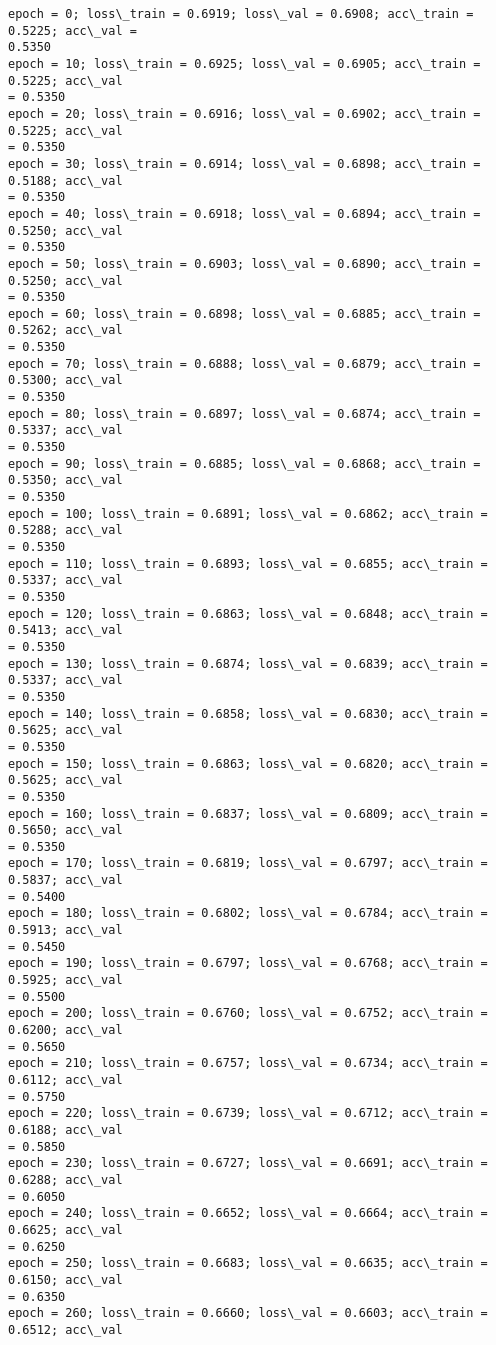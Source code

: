 \documentclass[10pt]{article}
\begin{document}
    \begin{Verbatim}[commandchars=\\\{\}]
epoch = 0; loss\_train = 0.6919; loss\_val = 0.6908; acc\_train = 0.5225; acc\_val =
0.5350
epoch = 10; loss\_train = 0.6925; loss\_val = 0.6905; acc\_train = 0.5225; acc\_val
= 0.5350
epoch = 20; loss\_train = 0.6916; loss\_val = 0.6902; acc\_train = 0.5225; acc\_val
= 0.5350
epoch = 30; loss\_train = 0.6914; loss\_val = 0.6898; acc\_train = 0.5188; acc\_val
= 0.5350
epoch = 40; loss\_train = 0.6918; loss\_val = 0.6894; acc\_train = 0.5250; acc\_val
= 0.5350
epoch = 50; loss\_train = 0.6903; loss\_val = 0.6890; acc\_train = 0.5250; acc\_val
= 0.5350
epoch = 60; loss\_train = 0.6898; loss\_val = 0.6885; acc\_train = 0.5262; acc\_val
= 0.5350
epoch = 70; loss\_train = 0.6888; loss\_val = 0.6879; acc\_train = 0.5300; acc\_val
= 0.5350
epoch = 80; loss\_train = 0.6897; loss\_val = 0.6874; acc\_train = 0.5337; acc\_val
= 0.5350
epoch = 90; loss\_train = 0.6885; loss\_val = 0.6868; acc\_train = 0.5350; acc\_val
= 0.5350
epoch = 100; loss\_train = 0.6891; loss\_val = 0.6862; acc\_train = 0.5288; acc\_val
= 0.5350
epoch = 110; loss\_train = 0.6893; loss\_val = 0.6855; acc\_train = 0.5337; acc\_val
= 0.5350
epoch = 120; loss\_train = 0.6863; loss\_val = 0.6848; acc\_train = 0.5413; acc\_val
= 0.5350
epoch = 130; loss\_train = 0.6874; loss\_val = 0.6839; acc\_train = 0.5337; acc\_val
= 0.5350
epoch = 140; loss\_train = 0.6858; loss\_val = 0.6830; acc\_train = 0.5625; acc\_val
= 0.5350
epoch = 150; loss\_train = 0.6863; loss\_val = 0.6820; acc\_train = 0.5625; acc\_val
= 0.5350
epoch = 160; loss\_train = 0.6837; loss\_val = 0.6809; acc\_train = 0.5650; acc\_val
= 0.5350
epoch = 170; loss\_train = 0.6819; loss\_val = 0.6797; acc\_train = 0.5837; acc\_val
= 0.5400
epoch = 180; loss\_train = 0.6802; loss\_val = 0.6784; acc\_train = 0.5913; acc\_val
= 0.5450
epoch = 190; loss\_train = 0.6797; loss\_val = 0.6768; acc\_train = 0.5925; acc\_val
= 0.5500
epoch = 200; loss\_train = 0.6760; loss\_val = 0.6752; acc\_train = 0.6200; acc\_val
= 0.5650
epoch = 210; loss\_train = 0.6757; loss\_val = 0.6734; acc\_train = 0.6112; acc\_val
= 0.5750
epoch = 220; loss\_train = 0.6739; loss\_val = 0.6712; acc\_train = 0.6188; acc\_val
= 0.5850
epoch = 230; loss\_train = 0.6727; loss\_val = 0.6691; acc\_train = 0.6288; acc\_val
= 0.6050
epoch = 240; loss\_train = 0.6652; loss\_val = 0.6664; acc\_train = 0.6625; acc\_val
= 0.6250
epoch = 250; loss\_train = 0.6683; loss\_val = 0.6635; acc\_train = 0.6150; acc\_val
= 0.6350
epoch = 260; loss\_train = 0.6660; loss\_val = 0.6603; acc\_train = 0.6512; acc\_val

\end{Verbatim}
\end{document}
